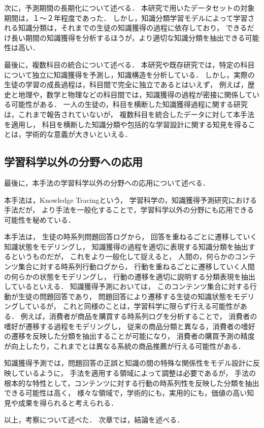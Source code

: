 次に，予測期間の長期化について述べる．
本研究で用いたデータセットの対象期間は，１〜２年程度であった．
しかし，知識分類学習モデルによって学習される知識分類は，それまでの生徒の知識獲得の過程に依存しており，
できるだけ長い期間の知識獲得を分析するほうが，より適切な知識分類を抽出できる可能性は高い．


最後に，複数科目の統合について述べる．
本研究や既存研究では，特定の科目について独立に知識獲得を予測し，知識構造を分析している．
しかし，実際の生徒の学習の成長過程は，科目間で完全に独立であるとはいえず，
例えば，歴史と地理や，数学と物理などの科目間では，知識獲得の過程が密接に関係している可能性がある．
一人の生徒の，科目を横断した知識獲得過程に関する研究は，これまで報告されていないが，
複数科目を統合したデータに対して本手法を適用し，
科目を横断した知識分類や包括的な学習設計に関する知見を得ることは，学術的な意義が大きいといえる．


\subsection{学習科学以外の分野への応用}
最後に，本手法の学習科学以外の分野への応用について述べる．

本手法は，Knowledge Tracingという，
学習科学の，知識獲得予測研究における手法だが，
より手法を一般化することで，学習科学以外の分野にも応用できる可能性を秘めている．

本手法は，
生徒の時系列問題回答ログから，
回答を重ねるごとに遷移していく知識状態をモデリングし，
知識獲得の過程を適切に表現する知識分類を抽出するというものだが，
これをより一般化して捉えると，
人間の，何らかのコンテンツ集合に対する時系列行動ログから，
行動を重ねるごとに遷移していく人間の何らかの状態をモデリングし，
行動の遷移を適切に説明する分類表現を抽出しているといえる．
知識獲得予測においては，
このコンテンツ集合に対する行動が生徒の問題回答であり，
問題回答により遷移する生徒の知識状態をモデリングしているが，
これと同様のことは，学習科学に限らず行える可能性がある．
例えば，消費者が商品を購買する時系列ログを分析することで，
消費者の嗜好が遷移する過程をモデリングし，
従来の商品分類と異なる，消費者の嗜好の遷移を反映した分類を抽出することが可能になり，
消費者の購買予測の精度が向上したり，これまでとは異なる系統の商品推薦が行える可能性がある．

知識獲得予測では，問題回答の正誤と知識の間の特殊な関係性をモデル設計に反映しているように，
手法を適用する領域によって調整は必要であるが，
手法の根本的な特性として，コンテンツに対する行動の時系列性を反映した分類を抽出できる可能性は高く，
様々な領域で，学術的にも，実用的にも，価値の高い知見や成果を得られると考えられる．




\vvspace
以上，考察について述べた．
次章では，結論を述べる．

